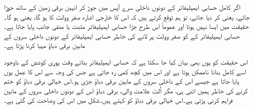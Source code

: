 
اگر کامل حسابی ایمپلیفائر کے دونوں داخلی سرے آپس میں جوڑ کر انہیں برقی زمین کے ساتھ جوڑا جائے، یعنی  کر دیا جائے، تو ہم توقع کرتے ہیں کہ اس کا خارجی   اشارہ صفر وولٹ کا ہو گا، یعنی  ہو گا۔حقیقت میں ایسا نہیں ہوتا اور عموماً اس طرح جڑا حسابی ایمپلیفائر مثبت یا منفی جانب  پایا جاتا ہے۔ حسابی ایمپلیفائر کے  کو صفر وولٹ پر لانے کی خاطر حسابی ایمپلیفائر کے دونوں داخلی سروں کے مابین برقی دباؤ  مہیا کرنا پڑتا ہے۔

	اس حقیقت کو یوں بھی بیان کیا جا سکتا ہے کہ حسابی ایمپلیفائر بناتے وقت پوری کوشش کے باوجود اسے کامل بنانا ناممکن ہوتا ہے اور اس میں کچھ کمی رہ جاتی ہے جس کی وجہ سے اس کا عمل یوں پایا جاتا ہے جیسے اس کے داخلی سروں کے مابین برقی دباؤ جڑی ہو۔اس خیالی برقی دباؤ  کو ختم کرنے کی خاطر ہمیں اتنی ہی، مگر اُلٹ علامت والی، برقی دباؤ  اس کے دونوں داخلی سروں کے مابین فراہم کرنی پڑتی ہے۔اس خیالی برقی دباؤ کو   کہتے ہیں۔شکل  میں اس کی وضاحت کی گئی ہے۔

